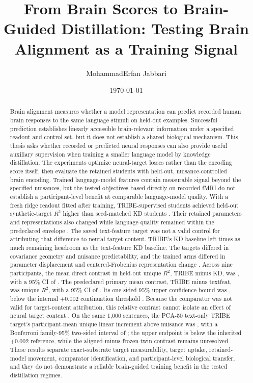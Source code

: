 \documentclass[11pt]{article}
\title{From Brain Scores to Brain-Guided Distillation: Testing Brain Alignment as a Training Signal}
\author{MohammadErfan Jabbari}
\date{\today}
\begin{document}
\maketitle
\begin{abstract}
Brain alignment measures whether a model representation can predict recorded human brain responses to the same language stimuli on held-out examples.
Successful prediction establishes linearly accessible brain-relevant information under a specified readout and control set, but it does not establish a shared biological mechanism.
This thesis asks whether recorded or predicted neural responses can also provide useful auxiliary supervision when training a smaller language model by knowledge distillation.
The experiments optimize neural-target losses rather than the encoding score itself, then evaluate the retained students with held-out, nuisance-controlled brain encoding.
Trained language-model features contain measurable signal beyond the specified nuisances, but the tested objectives based directly on recorded fMRI do not establish a participant-level benefit at comparable language-model quality.
With a fresh ridge readout fitted after training, TRIBE-supervised students achieved held-out synthetic-target $R^2$  higher than seed-matched KD students .
Their retained parameters and representations also changed while language quality remained within the predeclared envelope .
The saved text-feature target was not a valid control for attributing that difference to neural target content.
TRIBE's KD baseline left  times as much remaining headroom as the text-feature KD baseline.
The targets differed in covariance geometry and nuisance predictability, and the trained arms differed in parameter displacement and centered-Frobenius representation change .
Across nine participants, the mean direct contrast in held-out unique $R^2$, TRIBE minus KD, was , with a 95\% CI of  .
The predeclared primary mean contrast, TRIBE minus textfeat, was  unique $R^2$, with a 95\% CI of .
Its one-sided 95\% upper confidence bound was , below the internal $+0.002$ continuation threshold .
Because the comparator was not valid for target-content attribution, this relative contrast cannot isolate an effect of neural target content .
On the same 1,000 sentences, the PCA-50 text-only TRIBE target's participant-mean unique linear increment above nuisance was , with a Bonferroni family-95\% two-sided interval of ; the upper endpoint is below the inherited $+0.002$ reference, while the aligned-minus-frozen-twin contrast remains unresolved .
These results separate exact-substrate target measurability, target uptake, retained-model movement, comparator identification, and participant-level biological transfer, and they do not demonstrate a reliable brain-guided training benefit in the tested distillation regimes.
\end{abstract}
\tableofcontents
\end{document}
